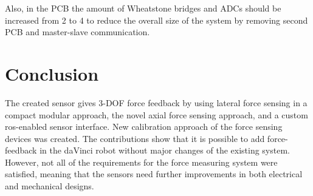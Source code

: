     Also, in the PCB the amount of Wheatstone bridges and ADCs should be increased from 2 to 4 to reduce the overall size of the system by removing second PCB and master-slave communication.
	
\section{Conclusion}

The created sensor gives 3-DOF force feedback by using lateral force sensing in a compact modular approach, the novel axial force sensing approach, and a custom ros-enabled sensor interface. New calibration approach of the force sensing devices was created. The contributions show that it is possible to add force-feedback in the daVinci robot without major changes of the existing system. However, not all of the requirements for the force measuring system were satisfied, meaning that the sensors need further improvements in both electrical and mechanical designs.
